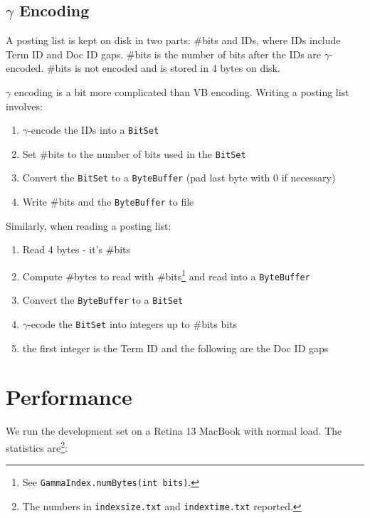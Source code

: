 \documentclass{article}
\begin{document}
\subsection{$\gamma$ Encoding}

A posting list is kept on disk in two parts: \#bits and IDs, where IDs include
Term ID and Doc ID gaps. \#bits is the number of bits after the IDs are
$\gamma$-encoded. \#bits is not encoded and is stored in 4 bytes on disk.

$\gamma$ encoding is a bit more complicated than VB encoding. Writing a
posting list involves:
\begin{enumerate}
  \item $\gamma$-encode the IDs into a {\texttt{BitSet}}
  
  \item Set \#bits to the number of bits used in the {\texttt{BitSet}}
  
  \item Convert the {\texttt{BitSet}} to a {\texttt{ByteBuffer}} (pad last byte
  with 0 if necessary)
  
  \item Write \#bits and the {\texttt{ByteBuffer}} to file
\end{enumerate}
Similarly, when reading a posting list:
\begin{enumerate}
  \item Read 4 bytes - it's \#bits
  
  \item Compute \#bytes to read with \#bits{\footnote{See
  {\texttt{GammaIndex.numBytes(int bits)}}.}} and read into a
  {\texttt{ByteBuffer}}
  
  \item Convert the {\texttt{ByteBuffer}} to a {\texttt{BitSet}}
  
  \item $\gamma$-ecode the {\texttt{BitSet}} into integers up to \#bits bits
  
  \item the first integer is the Term ID and the following are the Doc ID gaps
\end{enumerate}

\section{Performance}

We run the development set on a Retina 13 MacBook with normal load. The
statistics are{\footnote{The numbers in {\texttt{indexsize.txt}} and
{\texttt{indextime.txt}} reported.}}:
\end{document}
